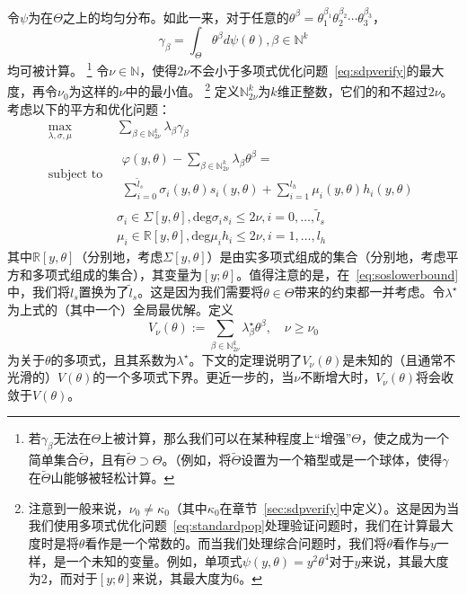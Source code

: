 令$\psi$为在$\Theta$之上的均匀分布。如此一来，对于任意的$\theta^\beta = \theta_1^{\beta_1} \theta_2^{\beta_2} \cdots \theta_3^{\beta_3}$，
\begin{equation}\label{eq:computemoments}
    \gamma_\beta = \int_{\Theta} \theta^\beta d \psi(\theta), \beta \in \mathbb{N}^k
\end{equation}
均可被计算。
\footnote{
    若$\gamma_\beta$无法在$\Theta$上被计算，那么我们可以在某种程度上“增强”$\Theta$，使之成为一个简单集合$\tilde{\Theta}$，且有$\tilde{\Theta} \supset \Theta$。（例如，将$\tilde{\Theta}$设置为一个箱型或是一个球体，使得$\gamma$在$\tilde{\Theta}$山能够被轻松计算。
}
令$\nu \in \mathbb{N}$，使得$2\nu$不会小于多项式优化问题~\eqref{eq:sdpverify}的最大度，再令$\nu_0$为这样的$\nu$中的最小值。
\footnote{
    注意到一般来说，$\nu_0 \ne \kappa_0$（其中$\kappa_0$在章节~\ref{sec:sdpverify}中定义）。这是因为当我们使用多项式优化问题~\eqref{eq:standardpop}处理验证问题时，我们在计算最大度时是将$\theta$看作是一个常数的。而当我们处理综合问题时，我们将$\theta$看作与$y$一样，是一个未知的变量。例如，单项式$\psi(y, \theta) = y^2\theta^4$对于$y$来说，其最大度为$2$，而对于$[y; \theta]$来说，其最大度为$6$。
}
定义$\mathbb{N}_{2\nu}^k$为$k$维正整数，它们的和不超过$2\nu$。考虑以下的平方和优化问题：
\begin{eqnarray}\label{eq:soslowerbound}
    \max_{\lambda, \sigma, \mu} & \sum_{\beta \in \mathbb{N}_{2\nu}^k} \lambda_\beta \gamma_\beta \\
    \text{subject to } & \substack{
        \varphi(y, \theta) - \sum_{\beta \in \mathbb{N}_{2\nu}^k} \lambda_\beta \theta^\beta =  \\
        \sum_{i=0}^{\tilde{l}_s} \sigma_i(y, \theta) s_i(y, \theta) + \sum_{i=1}^{l_h} \mu_i(y, \theta) h_i(y, \theta)
    } \\
    & \sigma_i \in \Sigma[y, \theta], \text{deg} \sigma_i s_i \le 2\nu, i = 0, \dots, \tilde{l}_s \\
    & \mu_i \in \mathbb{R}[y, \theta], \text{deg} \mu_i h_i \le 2\nu, i = 1, \dots, l_h
\end{eqnarray}
其中$\mathbb{R}[y, \theta]$（分别地，考虑$\Sigma[y, \theta]$）是由实多项式组成的集合（分别地，考虑平方和多项式组成的集合），其变量为$[y; \theta]$。值得注意的是，在~\eqref{eq:soslowerbound}中，我们将$l_s$置换为了$\tilde{l}_s$。这是因为我们需要将$\theta \in \Theta$带来的约束都一并考虑。令$\lambda^\star$为上式的（其中一个）全局最优解。定义
\begin{equation}\label{eq:polylowerbound}
    V_\nu(\theta) := \sum_{\beta \in \mathbb{N}_{2\nu}^k} \lambda_\beta^\star \theta^\beta, \quad \nu \ge \nu_0
\end{equation}
为关于$\theta$的多项式，且其系数为$\lambda^\star$。下文的定理说明了$V_\nu(\theta)$是未知的（且通常不光滑的）$V(\theta)$的一个多项式下界。更近一步的，当$\nu$不断增大时，$V_\nu(\theta)$将会收敛于$V(\theta)$。

